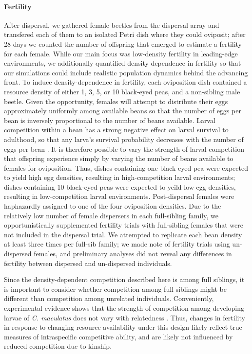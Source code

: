 \paragraph{Fertility}
After dispersal, we gathered female beetles from the dispersal array and transfered each of them to an isolated Petri dish where they could oviposit; after 28 days we counted the number of offspring that emerged to estimate a fertility for each female. While our main focus was low-density fertility in leading-edge environments, we additionally quantified density dependence in fertility so that our simulations could include realistic population dynamics behind the advancing front. To induce density-dependence in fertility, each oviposition dish contained a resource density of either 1, 3, 5, or 10 black-eyed peas, and a non-sibling male beetle. Given the opportunity, females will attempt to distribute their eggs approximately uniformly among available beans \citep{fujii_behavioral_1990} so that the number of eggs per bean is inversely proportional to the number of beans available. Larval competition within a bean has a strong negative effect on larval survival to adulthood, so that any larva's survival probability decreases with the number of eggs per bean \citep{giga_intraspecific_1991}. It is therefore possible to vary the strength of larval competition that offspring experience simply by varying the number of beans available to females for oviposition. Thus, dishes containing one black-eyed pea were expected to yield high egg densities, resulting in high-competition larval environments; dishes containing 10 black-eyed peas were expected to yeild low egg densities, resulting in low-competition larval environments. Post-dispersal females were haphazardly assigned to one of the four oviposition densities. Due to the relatively low number of female dispersers in each full-sibling family, we opportunistically supplemented fertility trials with full-sibling females that were not included in the dispersal trial. We attempted to replicate each bean density at least three times per full-sib family; we made note of fertility trials using un-dispersed females, and preliminary analyses did not reveal any differences in fertility between dispersed and un-dispersed individuals.

Since the density-dependent competition described here is among full siblings, it is important to consider whether competition among full siblings might be different than competition among unrelated individuals. Conveniently, experimental evidence shows that the strength of competition among developing larvae of \textit{C. maculatus} does not vary with relatedness \citep{smallegange_local_2008}. Thus, changes in fertility in response to changing resource availability under this design likely reflect true measures of intraspecific competitive ability, and are likely not influenced by reduced competition due to kinship.

